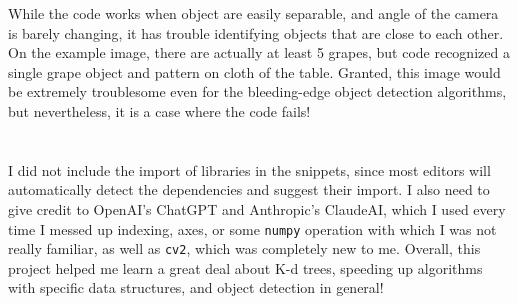 \documentclass{article}
\begin{document}
	While the code works when object are easily separable, and angle of the camera is barely changing, it has trouble identifying objects that are close to each other. On the example image, there are actually at least 5 grapes, but code recognized a single grape object and pattern on cloth of the table. Granted, this image would be extremely troublesome even for the bleeding-edge object detection algorithms, but nevertheless, it is a case where the code fails! \\\\\\
	
	
	I did not include the import of libraries in the snippets, since most editors will automatically detect the dependencies and suggest their import. I also need to give credit to OpenAI's ChatGPT and Anthropic's ClaudeAI, which I used every time I messed up indexing, axes, or some \texttt{numpy} operation with which I was not really familiar, as well as \texttt{cv2}, which was completely new to me. Overall, this project helped me learn a great deal about K-d trees, speeding up algorithms with specific data structures, and object detection in general!
	
\end{document}
